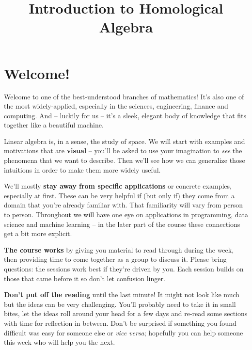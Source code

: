 \documentclass[oneside,english]{amsbook}
\numberwithin{section}{chapter}
\theoremstyle{plain}
\theoremstyle{definition}
\begin{document}
	
	\title{Introduction to Homological Algebra}
	
	\maketitle
	
	\tableofcontents
	
	\chapter*{Welcome!}
	
	\begin{comment}
		Fix all section headings
			Correct section level (e.g. subsection, remove paragraph etc)
			Remove numbering in titles
			Remove ALL label tags everywhere
		Fix inline maths in text form (a great many changes needed)
		Get graphics to import correctly
		Perhaps fix line breaks but that may be too painful
	\end{comment}
	


Welcome to one of the best-understood branches of mathematics! It's also
one of the most widely-applied, especially in the sciences, engineering,
finance and computing. And -- luckily for us -- it's a sleek, elegant
body of knowledge that fits together like a beautiful machine.

Linear algebra is, in a sense, the study of space. We will start with
examples and motivations that are \textbf{visual} -- you'll be asked to
use your imagination to \emph{see} the phenomena that we want to
describe. Then we'll see how we can generalize those intuitions in order
to make them more widely useful.

We'll mostly \textbf{stay away from specific applications} or concrete
examples, especially at first. These can be very helpful if (but only
if) they come from a domain that you're already familiar with. That
familiarity will vary from person to person. Throughout we will have one
eye on applications in programming, data science and machine learning --
in the later part of the course these connections get a bit more
explicit.

\textbf{The course works} by giving you material to read through during
the week, then providing time to come together as a group to discuss it.
Please bring questions: the sessions work best if they're
driven by you. Each session builds on those that came before it so don't
let confusion linger.

\textbf{Don't put off the reading} until the last minute! It might not
look like much but the ideas can be very challenging. You'll probably
need to take it in small bites, let the ideas roll around your head for
a few days and re-read some sections with time for reflection in
between. Don't be surprised if something you found difficult was easy
for someone else or \emph{vice versa}; hopefully you can help someone
this week who will help you the next.
\end{document}
